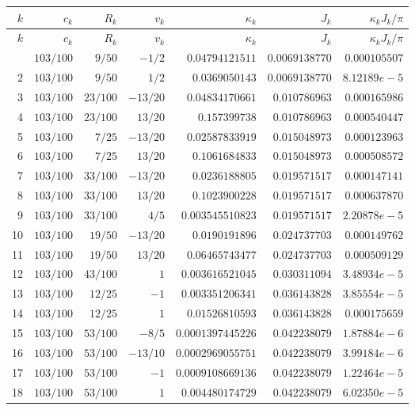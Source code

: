 \documentclass[11pt,reqno]{amsart}
\numberwithin{equation}{section}
\theoremstyle{definition}
\theoremstyle{remark}
\begin{document}
\small
\begin{center}
\begin{longtable}{@{}rrrrrrr@{}}\toprule $k$ & $c_k$ & $R_k$ & $v_k$ & $\kappa_k$ & $J_k$ & $\kappa_kJ_k/\pi$\\\midrule\endfirsthead
\toprule $k$ & $c_k$ & $R_k$ & $v_k$ & $\kappa_k$ & $J_k$ & $\kappa_kJ_k/\pi$\\\midrule\endhead
\bottomrule\endfoot
1 & $103/100$ & $9/50$ & $-1/2$ & $0.04794121511$ & $0.0069138770$ & $0.000105507$\\
2 & $103/100$ & $9/50$ & $1/2$ & $0.0369050143$ & $0.0069138770$ & $8.12189e-5$\\
3 & $103/100$ & $23/100$ & $-13/20$ & $0.04834170661$ & $0.010786963$ & $0.000165986$\\
4 & $103/100$ & $23/100$ & $13/20$ & $0.157399738$ & $0.010786963$ & $0.000540447$\\
5 & $103/100$ & $7/25$ & $-13/20$ & $0.02587833919$ & $0.015048973$ & $0.000123963$\\
6 & $103/100$ & $7/25$ & $13/20$ & $0.1061684833$ & $0.015048973$ & $0.000508572$\\
7 & $103/100$ & $33/100$ & $-13/20$ & $0.0236188805$ & $0.019571517$ & $0.000147141$\\
8 & $103/100$ & $33/100$ & $13/20$ & $0.1023900228$ & $0.019571517$ & $0.000637870$\\
9 & $103/100$ & $33/100$ & $4/5$ & $0.003545510823$ & $0.019571517$ & $2.20878e-5$\\
10 & $103/100$ & $19/50$ & $-13/20$ & $0.0190191896$ & $0.024737703$ & $0.000149762$\\
11 & $103/100$ & $19/50$ & $13/20$ & $0.06465743477$ & $0.024737703$ & $0.000509129$\\
12 & $103/100$ & $43/100$ & $1$ & $0.003616521045$ & $0.030311094$ & $3.48934e-5$\\
13 & $103/100$ & $12/25$ & $-1$ & $0.003351206341$ & $0.036143828$ & $3.85554e-5$\\
14 & $103/100$ & $12/25$ & $1$ & $0.01526810593$ & $0.036143828$ & $0.000175659$\\
15 & $103/100$ & $53/100$ & $-8/5$ & $0.0001397445226$ & $0.042238079$ & $1.87884e-6$\\
16 & $103/100$ & $53/100$ & $-13/10$ & $0.0002969055751$ & $0.042238079$ & $3.99184e-6$\\
17 & $103/100$ & $53/100$ & $-1$ & $0.0009108669136$ & $0.042238079$ & $1.22464e-5$\\
18 & $103/100$ & $53/100$ & $1$ & $0.004480174729$ & $0.042238079$ & $6.02350e-5$\\

\end{longtable}
\end{center}
\end{document}
